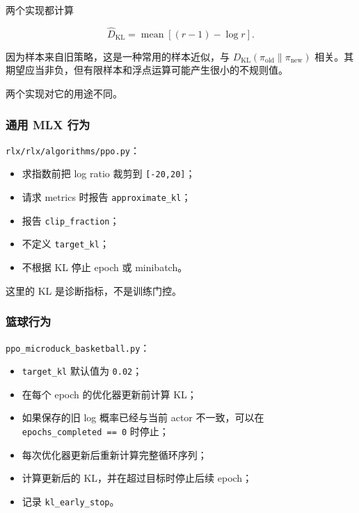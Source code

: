 \documentclass[
  chinese,
  11pt,
  letterpaper,
]{article}
\providecommand{\tightlist}{%
  \setlength{\itemsep}{0pt}\setlength{\parskip}{0pt}}
\begin{document}
两个实现都计算

\[
\widehat D_{\mathrm{KL}}
=
\operatorname{mean}\left[(r-1)-\log r\right].
\]

因为样本来自旧策略，这是一种常用的样本近似，与
\(D_{\mathrm{KL}}(\pi_{\mathrm{old}}\|\pi_{\mathrm{new}})\)
相关。其期望应当非负，但有限样本和浮点运算可能产生很小的不规则值。

两个实现对它的用途不同。

\subsubsection{通用 MLX 行为}\label{ux901aux7528-mlx-ux884cux4e3a}

\texttt{rlx/\allowbreak{}rlx/\allowbreak{}algorith\allowbreak{}ms/\allowbreak{}ppo.py}：

\begin{itemize}
\tightlist
\item
  求指数前把 log ratio 裁剪到 \texttt{{[}-20,20{]}}；
\item
  请求 metrics 时报告
  \texttt{approxim\allowbreak{}ate\_\allowbreak{}kl}；
\item
  报告 \texttt{clip\_\allowbreak{}fraction\allowbreak{}}；
\item
  不定义 \texttt{target\_kl}；
\item
  不根据 KL 停止 epoch 或 minibatch。
\end{itemize}

这里的 KL 是诊断指标，不是训练门控。

\subsubsection{篮球行为}\label{ux7beeux7403ux884cux4e3a}

\texttt{ppo\_\allowbreak{}microduc\allowbreak{}k\_\allowbreak{}basketba\allowbreak{}ll.py}：

\begin{itemize}
\tightlist
\item
  \texttt{target\_kl} 默认值为 \texttt{0.02}；
\item
  在每个 epoch 的优化器更新前计算 KL；
\item
  如果保存的旧 log 概率已经与当前 actor 不一致，可以在
  \texttt{epochs\_completed\ ==\ 0} 时停止；
\item
  每次优化器更新后重新计算完整循环序列；
\item
  计算更新后的 KL，并在超过目标时停止后续 epoch；
\item
  记录 \texttt{kl\_\allowbreak{}early\_\allowbreak{}stop}。
\end{itemize}
\end{document}
